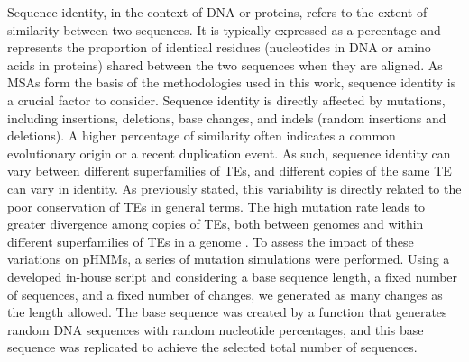 \documentclass[unnumsec,webpdf,contemporary,large]{oup-authoring-template}%
\theoremstyle{thmstyleone}%
\theoremstyle{thmstyletwo}%
\theoremstyle{thmstylethree}%
\begin{document}
Sequence identity, in the context of DNA or proteins, refers to the extent of similarity between two sequences. It is typically expressed as a percentage and represents the proportion of identical residues (nucleotides in DNA or amino acids in proteins) shared between the two sequences when they are aligned. As MSAs form the basis of the methodologies used in this work, sequence identity is a crucial factor to consider. Sequence identity is directly affected by mutations, including insertions, deletions, base changes, and indels (random insertions and deletions). A higher percentage of similarity often indicates a common evolutionary origin or a recent duplication event. As such, sequence identity can vary between different superfamilies of TEs, and different copies of the same TE can vary in identity. As previously stated, this variability is directly related to the poor conservation of TEs in general terms. The high mutation rate leads to greater divergence among copies of TEs, both between genomes and within different superfamilies of TEs in a genome \cite{phimister_mobile_2017, bourque_ten_2018, arkhipova_giant_2019}. To assess the impact of these variations on pHMMs, a series of mutation simulations were performed. Using a developed in-house script and considering a base sequence length, a fixed number of sequences, and a fixed number of changes, we generated as many changes as the length allowed. The base sequence was created by a function that generates random DNA sequences with random nucleotide percentages, and this base sequence was replicated to achieve the selected total number of sequences.
\end{document}
